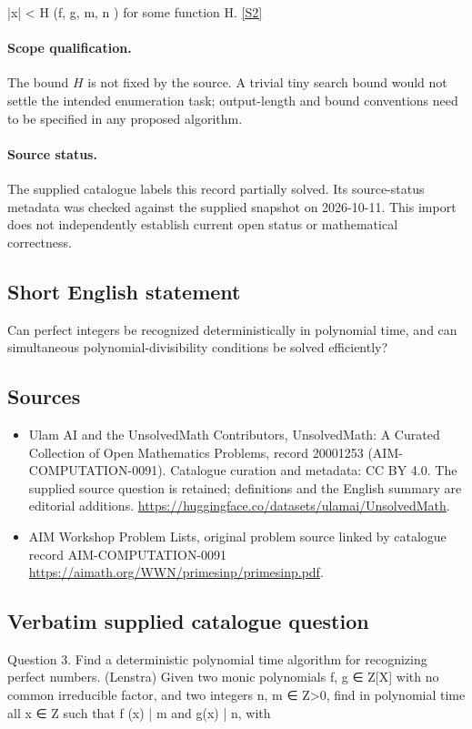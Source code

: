 \documentclass[11pt]{article}
\begin{document}
|x| < H (f, g, m, n ) for some function H. \href{https://aimath.org/WWN/primesinp/primesinp.pdf}{[S2]}
\paragraph{Scope qualification.}
The bound $H$ is not fixed by the source. A trivial tiny search bound would not settle the intended enumeration task; output-length and bound conventions need to be specified in any proposed algorithm.
\paragraph{Source status.}
The supplied catalogue labels this record partially solved. Its source-status metadata was checked against the supplied snapshot on 2026-10-11. This import does not independently establish current open status or mathematical correctness.
\subsection{Short English statement}
Can perfect integers be recognized deterministically in polynomial time, and can simultaneous polynomial-divisibility conditions be solved efficiently?
\subsection{Sources}
\begin{itemize}
\item[S1] Ulam AI and the UnsolvedMath Contributors, UnsolvedMath: A Curated Collection of Open Mathematics Problems, record 20001253 (AIM-COMPUTATION-0091). Catalogue curation and metadata: CC BY 4.0. The supplied source question is retained; definitions and the English summary are editorial additions.
\url{https://huggingface.co/datasets/ulamai/UnsolvedMath}.
\item[S2] AIM Workshop Problem Lists, original problem source linked by catalogue record AIM-COMPUTATION-0091
\url{https://aimath.org/WWN/primesinp/primesinp.pdf}.
\end{itemize}
\subsection{Verbatim supplied catalogue question}
Question 3. Find a deterministic polynomial time algorithm for recognizing perfect numbers. (Lenstra) Given two monic polynomials f, g ∈ Z[X] with no common irreducible factor, and two integers n, m ∈ Z>0, find in polynomial time all x ∈ Z such that f (x) | m and g(x) | n, with
\end{document}
